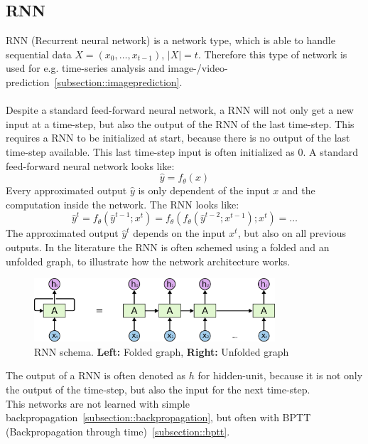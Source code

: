  \subsection{RNN} \label{subsection::rnn}
  RNN (Recurrent neural network) is a network type, which is able to handle sequential data $X = (x_0, \ldots, x_{t-1})$, $|X| = t$. Therefore this type of network is used for e.g. time-series 
  analysis and image-/video-prediction~\ref{subsection::imageprediction}.\\\\
  Despite a standard feed-forward neural network, a RNN will not only get a new input at a time-step, but also the output
  of the RNN of the last time-step. This requires a RNN to be initialized at start, because there is no output of the last time-step available. This last time-step input is often initialized as $0$.
  A standard feed-forward neural network looks like:
  \begin{equation}
   \hat{y} = f_{\theta}(x)
  \end{equation}
  Every approximated output $\hat{y}$ is only dependent of the input $x$ and the computation inside the network.
  The RNN looks like:
  \begin{equation}
   \hat{y}^t = f_{\theta}(\hat{y}^{t-1};x^t) = f_{\theta}(f_{\theta}(\hat{y}^{t-2};x^{t-1});x^t) = \ldots
  \end{equation}
  The approximated output $\hat{y}^t$ depends on the input $x^t$, but also on all previous outputs.
  In the literature the RNN is often schemed using a folded and an unfolded graph, to illustrate how the network architecture works.
  \begin{figure}[H]
   \includegraphics[width=0.8\textwidth]{../Images/rnn.png}
   \centering
   \caption{RNN schema. \textbf{Left:} Folded graph, \textbf{Right:} Unfolded graph \cite{Olah2015}}
   \label{fig:lstm_architecture}
  \end{figure}\noindent
  The output of a RNN is often denoted as $h$ for hidden-unit, because it is not only the output of the time-step, but also the input for the next time-step. \label{sentence::hidden}\\
  This networks are not learned with simple backpropagation~\ref{subsection::backpropagation}, but often with BPTT (Backpropagation through time)~\ref{subsection::bptt}.
 
